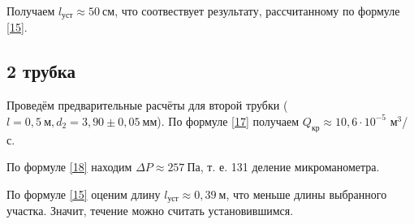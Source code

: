 \documentclass[a4paper, 12pt]{article}
\begin{document}
Получаем $l_{\text{уст}} \approx 50~\text{см}$, что соотвествует результату, рассчитанному по формуле \eqref{15}.\\[3cm]
\subsection{2 трубка}
\par Проведём предварительные расчёты для второй трубки ($l = 0,5~\text{м}, d_2 = 3,90\pm0,05~\text{мм}$). По формуле \eqref{17} получаем $Q_{\text{кр}} \approx 10,6 \cdot 10^{-5}$ м$^3$/с.
\par По формуле \eqref{18} находим $\Delta{P} \approx 257~\text{Па}$, т. е. 131 деление микроманометра.
\par По формуле \eqref{15} оценим длину $l_{\text{уст}} \approx 0,39~\text{м}$, что меньше длины выбранного участка. Значит, течение можно считать установившимся.
\end{document}
